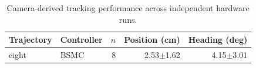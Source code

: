 \begin{table}[!t]
\centering
\caption{Camera-derived tracking performance across independent hardware runs.}
\label{tab:tracking}
\begin{tabular}{llrrr}
\hline
Trajectory & Controller & $n$ & Position (cm) & Heading (deg) \\
\hline
eight & BSMC & 8 & 2.53$\pm$1.62 & 4.15$\pm$3.01 \\
\hline
\end{tabular}
\end{table}
